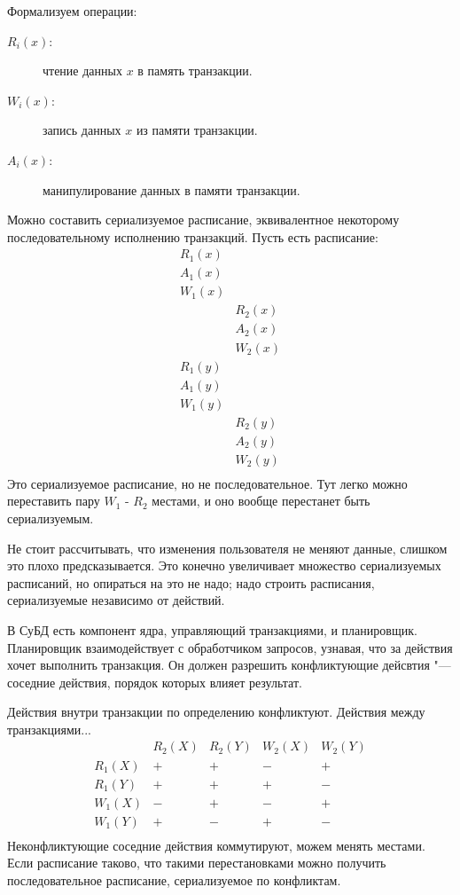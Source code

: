Формализуем операции:
\begin{description}
	\item[$R_i(x)$:] чтение данных $x$ в память транзакции.
	\item[$W_i(x)$:] запись данных $x$ из памяти транзакции.
	\item[$A_i(x)$:] манипулирование данных в памяти транзакции.
\end{description}

Можно составить сериализуемое расписание, эквивалентное некоторому последовательному исполнению транзакций.
Пусть есть расписание:
\[\begin{array}{cc}
	R_1(x) & \\
	A_1(x) & \\
	W_1(x) & \\
	& R_2(x) \\
	& A_2(x) \\
	& W_2(x) \\
	R_1(y) & \\
	A_1(y) & \\
	W_1(y) & \\
	& R_2(y) \\
	& A_2(y) \\
	& W_2(y) \\
\end{array}\]
Это сериализуемое расписание, но не последовательное.
Тут легко можно переставить пару $W_1$ - $R_2$ местами, и оно вообще перестанет быть сериализуемым.

Не стоит рассчитывать, что изменения пользователя не меняют данные, слишком это плохо предсказывается.
Это конечно увеличивает множество сериализуемых расписаний, но опираться на это не надо;
надо строить расписания, сериализуемые независимо от действий.

В СуБД есть компонент ядра, управляющий транзакциями, и планировщик.
Планировщик взаимодействует с обработчиком запросов, узнавая, что за действия хочет выполнить транзакция.
Он должен разрешить конфликтующие дейсвтия "--- соседние действия, порядок которых влияет результат.

Действия внутри транзакции по определению конфликтуют.
Действия между транзакциями...
\[\begin{array}{c|cccc}
	       & R_2(X) & R_2(Y) & W_2(X) & W_2(Y) \\ \hline
	R_1(X) &   +    &   +    &   -    &   +    \\ 
	R_1(Y) &   +    &   +    &   +    &   -    \\ 
	W_1(X) &   -    &   +    &   -    &   +    \\ 
	W_1(Y) &   +    &   -    &   +    &   -    \\ 
\end{array}\]
Неконфликтующие соседние действия коммутируют, можем менять местами.
Если расписание таково, что такими перестановками можно получить последовательное расписание, сериализуемое по конфликтам.


